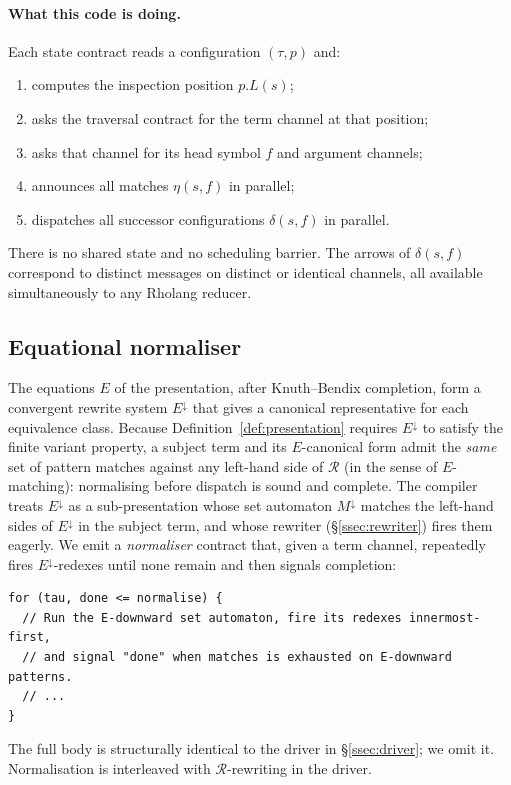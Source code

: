 \documentclass[11pt]{article}
\theoremstyle{plain}
\theoremstyle{definition}
\theoremstyle{remark}
\begin{document}
\paragraph{What this code is doing.}
Each state contract reads a configuration $(\tau, p)$ and:
\begin{enumerate}[leftmargin=*]
  \item computes the inspection position $p.L(s)$;
  \item asks the traversal contract for the term channel at that
        position;
  \item asks that channel for its head symbol $f$ and argument
        channels;
  \item announces all matches $\eta(s, f)$ in parallel;
  \item dispatches all successor configurations $\delta(s, f)$ in
        parallel.
\end{enumerate}
There is no shared state and no scheduling barrier. The arrows of
$\delta(s, f)$ correspond to distinct messages on distinct or identical
channels, all available simultaneously to any Rholang reducer.

\subsection{Equational normaliser}\label{ssec:emit-normaliser}

The equations $E$ of the presentation, after Knuth--Bendix completion,
form a convergent rewrite system $E^{\downarrow}$ that gives a canonical
representative for each equivalence class. Because Definition~\ref{def:presentation}
requires $E^{\downarrow}$ to satisfy the finite variant property, a
subject term and its $E$-canonical form admit the \emph{same} set of
pattern matches against any left-hand side of $\mathcal{R}$ (in the
sense of $E$-matching): normalising before dispatch is sound and
complete. The compiler treats $E^{\downarrow}$ as a sub-presentation
whose set automaton $M^{\downarrow}$ matches the left-hand sides of
$E^{\downarrow}$ in the subject term, and whose rewriter
(\S\ref{ssec:rewriter}) fires them eagerly. We emit a \emph{normaliser}
contract that, given a term channel, repeatedly fires
$E^{\downarrow}$-redexes until none remain and then signals completion:
\begin{lstlisting}
for (tau, done <= normalise) {
  // Run the E-downward set automaton, fire its redexes innermost-first,
  // and signal "done" when matches is exhausted on E-downward patterns.
  // ...
}
\end{lstlisting}
The full body is structurally identical to the driver in
\S\ref{ssec:driver}; we omit it. Normalisation is interleaved with
$\mathcal{R}$-rewriting in the driver.
\end{document}
